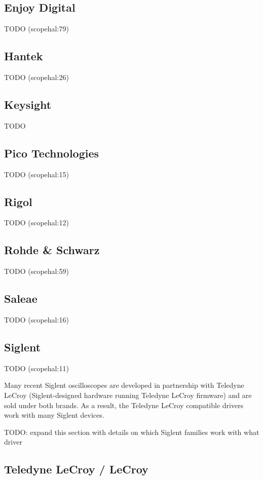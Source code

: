 \documentclass[11pt]{article}
\begin{document}
\subsection{Enjoy Digital}
TODO (scopehal:79)

\subsection{Hantek}
TODO (scopehal:26)

\subsection{Keysight}
TODO

\subsection{Pico Technologies}
TODO (scopehal:15)

\subsection{Rigol}
TODO (scopehal:12)

\subsection{Rohde \& Schwarz}
TODO (scopehal:59)

\subsection{Saleae}
TODO (scopehal:16)

\subsection{Siglent}

TODO (scopehal:11)

Many recent Siglent oscilloscopes are developed in partnership with Teledyne LeCroy (Siglent-designed hardware running
Teledyne LeCroy firmware) and are sold under both brands. As a result, the Teledyne LeCroy compatible drivers work with
many Siglent devices.

TODO: expand this section with details on which Siglent families work with what driver

\subsection{Teledyne LeCroy / LeCroy}
\end{document}
